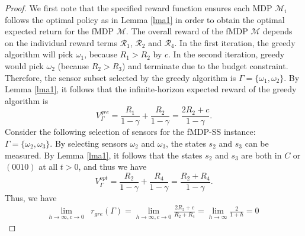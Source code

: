 \documentclass[10pt,a4paper]{amsart}
\begin{document}
\begin{proof}
We first note that the specified reward function ensures each MDP $\mathcal{M}_i$ follows the optimal policy as in Lemma \ref{lma1} in order to obtain the optimal expected return for the fMDP $\mathcal{M}$. The overall reward of the fMDP $\mathcal{M}$ depends on the individual reward terms $\mathcal{R}_1$, $\mathcal{R}_2$ and $\mathcal{R}_4$. In the first iteration, the greedy algorithm will pick $\omega_1$, because $R_1 > R_2$ by $c$. In the second iteration, greedy would pick $\omega_2$ (because $R_2 > R_3$) and terminate due to the budget constraint. Therefore, the sensor subset selected by the greedy algorithm is $\Gamma = \{ \omega_1, \omega_2 \}$. By Lemma \ref{lma1}, it follows that the infinite-horizon expected reward of the greedy algorithm is 
\begin{equation}
\label{eq:gre}
    V_{\Gamma}^{gre} = \frac{R_1}{1-\gamma} + \frac{R_2}{1-\gamma}  = \frac{2R_2 + c}{1-\gamma}.
\end{equation}
Consider the following selection of sensors for the fMDP-SS instance:  $\Gamma = \{ \omega_2, \omega_3 \}$. By selecting sensors $\omega_2$ and $\omega_3$, the states $s_2 $ and $s_3$ can be measured. By Lemma \ref{lma1}, it follows that the states $s_2$ and $s_3$ are both in $C$ or $(0010)$ at all $t>0$, and thus we have
\begin{equation}
\label{eq:opt}
    V_{\Gamma}^{opt} = \frac{R_2}{1-\gamma} + \frac{R_4}{1-\gamma}  = \frac{R_2 + R_4}{1-\gamma}. 
\end{equation}
 Thus, we have 
\begin{equation*}
\begin{aligned}
    \lim_{h \rightarrow \infty, c \rightarrow 0} & r_{gre}(\Gamma) = \lim_{h \rightarrow \infty, c \rightarrow 0}  \frac{2R_2 + c}{R_2+R_4} =\lim_{h \rightarrow \infty}  \frac{2}{1+h} = 0 
\end{aligned}
\end{equation*} \end{proof}
\end{document}
